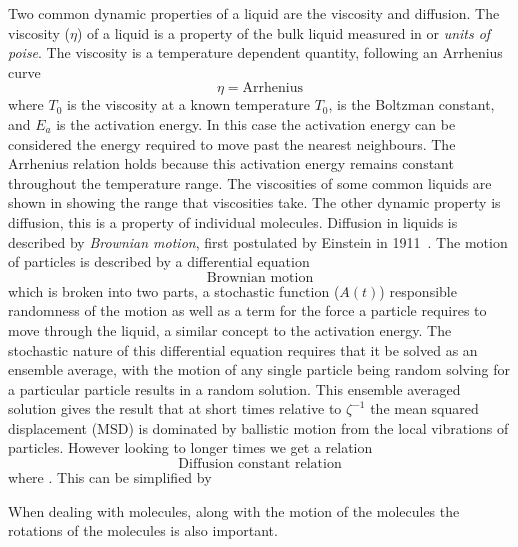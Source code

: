 \begin{figure}
    \caption{}
    \label{fig:radial distribution}
\end{figure}

Two common dynamic properties of a liquid are the viscosity and diffusion. The viscosity ($\eta$) of a liquid is a property of the bulk liquid measured in \si{\poise} or \emph{units of poise}. The viscosity is a temperature dependent quantity, following an Arrhenius curve
\begin{equation}
	\eta = \text{Arrhenius}
\end{equation}
where $T_0$ is the viscosity at a known temperature $T_0$, \kb is the Boltzman constant, and $E_a$ is the activation energy. In this case the activation energy can be considered the energy required to move past the nearest neighbours. The Arrhenius relation holds because this activation energy remains constant throughout the temperature range. The viscosities of some common liquids are shown in \tabref{} showing the range that viscosities take. The other dynamic property is diffusion, this is a property of individual molecules. Diffusion in liquids is described by \emph{Brownian motion}, first postulated by Einstein in 1911~\tocheck. The motion of particles is described by a differential equation 
\begin{equation}
	\text{Brownian motion}
\end{equation}
which is broken into two parts, a stochastic function ($A(t)$) responsible randomness of the motion as well as a term for the force a particle requires to move through the liquid, a similar concept to the activation energy. The stochastic nature of this differential equation requires that it be solved as an ensemble average, with the motion of any single particle being random solving for a particular particle results in a random solution. This ensemble averaged solution gives the result that at short times relative to $\zeta^{-1}$ the mean squared displacement (MSD) is dominated by ballistic motion from the local vibrations of particles. However looking to longer times we get a relation
\begin{equation}
	\text{Diffusion constant relation}
\end{equation}
where . This can be simplified by 



When dealing with molecules, along with the motion of the molecules the rotations of the molecules is also important. 



